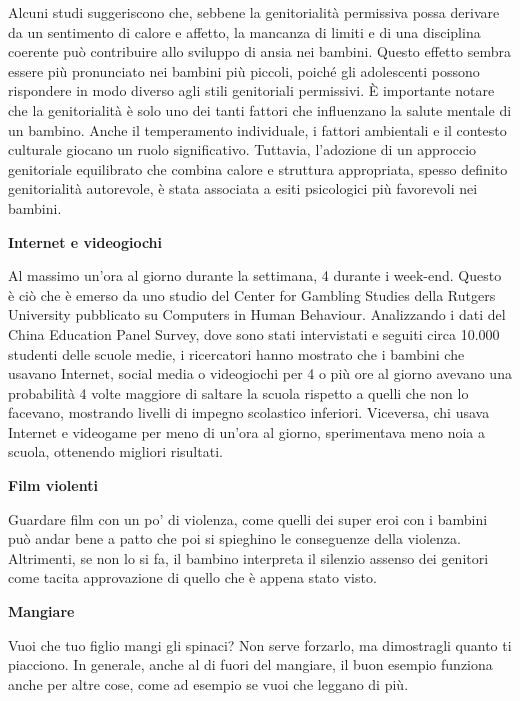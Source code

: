 \documentclass[12pt]{book} %
\begin{document}
Alcuni studi suggeriscono che, sebbene la genitorialità permissiva possa derivare da un sentimento di calore e affetto, la mancanza di limiti e di una disciplina coerente può contribuire allo sviluppo di ansia nei bambini. Questo effetto sembra essere più pronunciato nei bambini più piccoli, poiché gli adolescenti possono rispondere in modo diverso agli stili genitoriali permissivi. È importante notare che la genitorialità è solo uno dei tanti fattori che influenzano la salute mentale di un bambino. Anche il temperamento individuale, i fattori ambientali e il contesto culturale giocano un ruolo significativo. Tuttavia, l'adozione di un approccio genitoriale equilibrato che combina calore e struttura appropriata, spesso definito genitorialità autorevole, è stata associata a esiti psicologici più favorevoli nei bambini.

\textbf{Internet e videogiochi}

Al massimo un'ora al giorno durante la settimana, 4 durante i week-end. Questo è ciò che è emerso da uno studio del
Center for Gambling Studies della Rutgers University pubblicato su Computers in Human Behaviour. Analizzando i dati del
China Education Panel Survey, dove sono stati intervistati e seguiti circa 10.000 studenti delle scuole medie, i
ricercatori hanno mostrato che i bambini che usavano Internet, social media o videogiochi per 4 o più ore al giorno
avevano una probabilità 4 volte maggiore di saltare la scuola rispetto a quelli che non lo facevano, mostrando livelli
di impegno scolastico inferiori. Viceversa, chi usava Internet e videogame per meno di un'ora al giorno, sperimentava
meno noia a scuola, ottenendo migliori risultati. 

\textbf{Film violenti}

Guardare film con un po' di violenza, come quelli dei super eroi con i bambini può andar bene a patto che poi si
spieghino le conseguenze della violenza. Altrimenti, se non lo si fa, il bambino interpreta il silenzio assenso dei
genitori come tacita approvazione di quello che è appena stato visto.

\textbf{Mangiare}

Vuoi che tuo figlio mangi gli spinaci? Non serve forzarlo, ma dimostragli quanto ti piacciono. In generale, anche al di
fuori del mangiare, il buon esempio funziona anche per altre cose, come ad esempio se vuoi che leggano di più.
\end{document}
